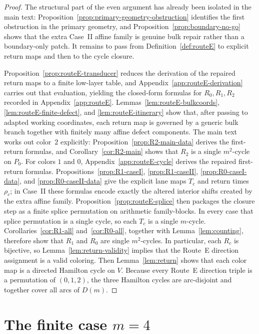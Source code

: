 \documentclass[11pt]{article}
\begin{document}
\begin{proof}
The structural part of the even argument has already been isolated in the main text: Proposition~\ref{prop:primary-geometry-obstruction} identifies the first obstruction in the primary geometry, and Proposition~\ref{prop:boundary-no-go} shows that the extra Case~II affine family is genuine bulk repair rather than a boundary-only patch.
It remains to pass from Definition~\ref{def:routeE} to explicit return maps and then to the cycle closure.

Proposition~\ref{prop:routeE-transducer} reduces the derivation of the repaired return maps to a finite low-layer table, and Appendix~\ref{app:routeE-derivation} carries out that evaluation, yielding the closed-form formulas for $R_0,R_1,R_2$ recorded in Appendix~\ref{app:routeE}.
Lemmas~\ref{lem:routeE-bulkcoords}, \ref{lem:routeE-finite-defect}, and \ref{lem:routeE-itinerary} show that, after passing to adapted working coordinates, each return map is governed by a generic bulk branch together with finitely many affine defect components.
The main text works out color~$2$ explicitly: Proposition~\ref{prop:R2-main-data} derives the first-return formulas, and Corollary~\ref{cor:R2-main} shows that $R_2$ is a single $m^2$-cycle on $P_0$.
For colors $1$ and $0$, Appendix~\ref{app:routeE-cycle} derives the repaired first-return formulas.
Propositions~\ref{prop:R1-caseI}, \ref{prop:R1-caseII}, \ref{prop:R0-caseI-data}, and \ref{prop:R0-caseII-data} give the explicit lane maps $T_c$ and return times $\rho_c$; in Case~II these formulas encode exactly the altered interior shifts created by the extra affine family.
Proposition~\ref{prop:routeE-splice} then packages the closure step as a finite splice permutation on arithmetic family-blocks.
In every case that splice permutation is a single cycle, so each $T_c$ is a single $m$-cycle.
Corollaries~\ref{cor:R1-all} and~\ref{cor:R0-all}, together with Lemma~\ref{lem:counting}, therefore show that $R_1$ and $R_0$ are single $m^2$-cycles.
In particular, each $R_c$ is bijective, so Lemma~\ref{lem:return-validity} implies that the Route~E direction assignment is a valid coloring.
Then Lemma~\ref{lem:return} shows that each color map is a directed Hamilton cycle on $V$.
Because every Route~E direction triple is a permutation of $(0,1,2)$, the three Hamilton cycles are arc-disjoint and together cover all arcs of $D(m)$.
\end{proof}

\section{The finite case $m=4$}\label{sec:m4}
\end{document}
